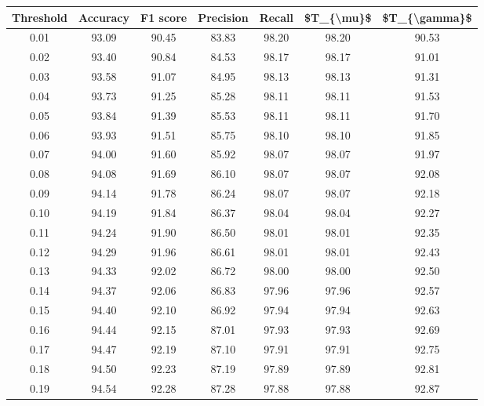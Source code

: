 \begin{tabular}{|c|c|c|c|c|c|c|}
\hline
 Threshold &  Accuracy &  F1 score &  Precision &  Recall &  \$T\_\{\textbackslash mu\}\$ &  \$T\_\{\textbackslash gamma\}\$ \\
\hline
      0.01 &     93.09 &     90.45 &      83.83 &   98.20 &      98.20 &         90.53 \\
      0.02 &     93.40 &     90.84 &      84.53 &   98.17 &      98.17 &         91.01 \\
      0.03 &     93.58 &     91.07 &      84.95 &   98.13 &      98.13 &         91.31 \\
      0.04 &     93.73 &     91.25 &      85.28 &   98.11 &      98.11 &         91.53 \\
      0.05 &     93.84 &     91.39 &      85.53 &   98.11 &      98.11 &         91.70 \\
      0.06 &     93.93 &     91.51 &      85.75 &   98.10 &      98.10 &         91.85 \\
      0.07 &     94.00 &     91.60 &      85.92 &   98.07 &      98.07 &         91.97 \\
      0.08 &     94.08 &     91.69 &      86.10 &   98.07 &      98.07 &         92.08 \\
      0.09 &     94.14 &     91.78 &      86.24 &   98.07 &      98.07 &         92.18 \\
      0.10 &     94.19 &     91.84 &      86.37 &   98.04 &      98.04 &         92.27 \\
      0.11 &     94.24 &     91.90 &      86.50 &   98.01 &      98.01 &         92.35 \\
      0.12 &     94.29 &     91.96 &      86.61 &   98.01 &      98.01 &         92.43 \\
      0.13 &     94.33 &     92.02 &      86.72 &   98.00 &      98.00 &         92.50 \\
      0.14 &     94.37 &     92.06 &      86.83 &   97.96 &      97.96 &         92.57 \\
      0.15 &     94.40 &     92.10 &      86.92 &   97.94 &      97.94 &         92.63 \\
      0.16 &     94.44 &     92.15 &      87.01 &   97.93 &      97.93 &         92.69 \\
      0.17 &     94.47 &     92.19 &      87.10 &   97.91 &      97.91 &         92.75 \\
      0.18 &     94.50 &     92.23 &      87.19 &   97.89 &      97.89 &         92.81 \\
      0.19 &     94.54 &     92.28 &      87.28 &   97.88 &      97.88 &         92.87 \\

\end{tabular}

